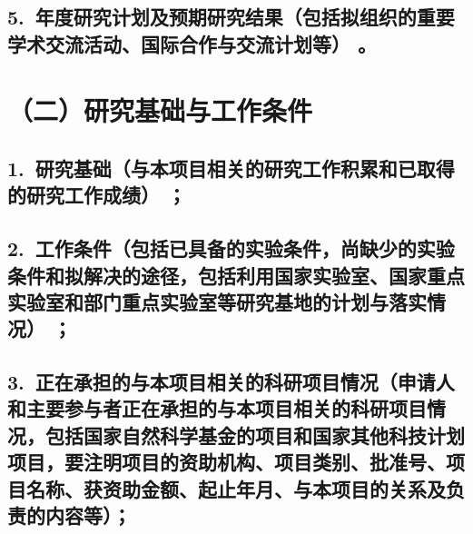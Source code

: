 \documentclass[12pt,UTF8,AutoFakeBold=2.5,a4paper]{ctexart} %
\begin{document}



\subsection{\hspace{1.5em}  5.~{\bfseries 年度研究计划及预期研究结果}（包括拟组织的重要学术交流活动、国际合作与交流计划等）\hspace{-14pt} 。}






\section{{\bfseries（二）研究基础与工作条件}} %
\subsection{\hspace{1.45em}  1.~{\bfseries 研究基础}（与本项目相关的研究工作积累和已取得的研究工作成绩）\hspace{-14pt} ；}




\subsection{\hspace{1.45em}  2.~{\bfseries 工作条件}（包括已具备的实验条件，尚缺少的实验条件和拟解决的途径，包括利用国家实验室、国家重点实验室和部门重点实验室等研究基地的计划与落实情况）\hspace{-14pt}  ；}



\subsection{\hspace{1.45em}  3.~{\bfseries 正在承担的与本项目相关的科研项目情况}（申请人和主要参与者正在承担的与本项目相关的科研项目情况，包括国家自然科学基金的项目和国家其他科技计划项目，要注明项目的资助机构、项目类别、批准号、项目名称、获资助金额、起止年月、\hspace{-4pt}与本项目的关系及负责的内容等）；\hspace{-14pt} }
\end{document}

